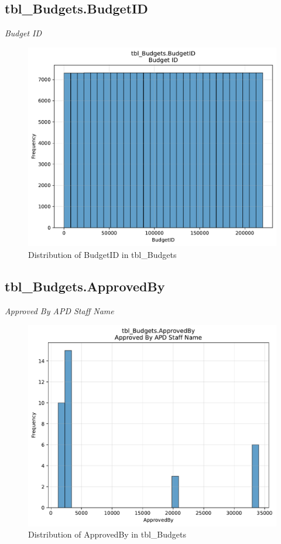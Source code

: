 \subsection{tbl\_Budgets.BudgetID}
\textit{Budget ID}

\begin{figure}[htbp]
\centering
\includegraphics[width=\textwidth]{figures/dbo_tbl_Budgets_BudgetID.pdf}
\caption{Distribution of BudgetID in tbl\_Budgets}
\end{figure}\newpage

\subsection{tbl\_Budgets.ApprovedBy}
\textit{Approved By APD Staff Name}

\begin{figure}[htbp]
\centering
\includegraphics[width=\textwidth]{figures/dbo_tbl_Budgets_ApprovedBy.pdf}
\caption{Distribution of ApprovedBy in tbl\_Budgets}
\end{figure}\newpage

